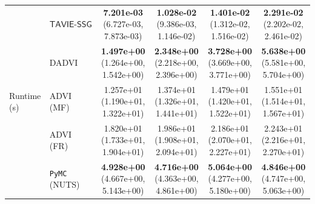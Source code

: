 \documentclass[12pt]{article}
\numberwithin{equation}{section}
\newcommand{\tssg}{\mathsf{TAVIE}\text{-}\mathsf{SSG}}
\begin{document}
{\begin{longtable}{llcccc}
\multirow{5}{*}{Runtime (s)}
& $\tssg$ & \makecell[c]{\textbf{7.201e-03}\\(6.727e-03, 7.873e-03)} & \makecell[c]{\textbf{1.028e-02}\\(9.386e-03, 1.146e-02)} & \makecell[c]{\textbf{1.401e-02}\\(1.312e-02, 1.516e-02)} & \makecell[c]{\textbf{2.291e-02}\\(2.202e-02, 2.461e-02)} \\
& DADVI & \makecell[c]{\textbf{1.497e+00}\\(1.264e+00, 1.542e+00)} & \makecell[c]{\textbf{2.348e+00}\\(2.218e+00, 2.396e+00)} & \makecell[c]{\textbf{3.728e+00}\\(3.669e+00, 3.771e+00)} & \makecell[c]{\textbf{5.638e+00}\\(5.581e+00, 5.704e+00)} \\
& ADVI (MF) & \makecell[c]{1.257e+01\\(1.190e+01, 1.322e+01)} & \makecell[c]{1.374e+01\\(1.326e+01, 1.441e+01)} & \makecell[c]{1.479e+01\\(1.420e+01, 1.522e+01)} & \makecell[c]{1.551e+01\\(1.514e+01, 1.567e+01)} \\
& ADVI (FR) & \makecell[c]{1.820e+01\\(1.733e+01, 1.904e+01)} & \makecell[c]{1.986e+01\\(1.908e+01, 2.094e+01)} & \makecell[c]{2.186e+01\\(2.070e+01, 2.227e+01)} & \makecell[c]{2.243e+01\\(2.216e+01, 2.270e+01)} \\
& \texttt{PyMC} (NUTS) & \makecell[c]{\textbf{4.928e+00}\\(4.667e+00, 5.143e+00)} & \makecell[c]{\textbf{4.716e+00}\\(4.363e+00, 4.861e+00)} & \makecell[c]{\textbf{5.064e+00}\\(4.277e+00, 5.180e+00)} & \makecell[c]{\textbf{4.846e+00}\\(4.747e+00, 5.063e+00)} \\
\hline
\end{longtable}
}
\end{document}
